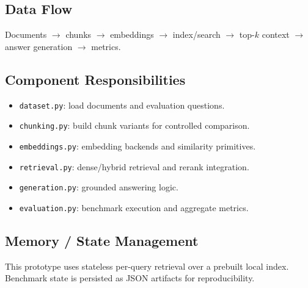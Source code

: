 \documentclass[11pt,a4paper]{article}
\begin{document}
\subsection{Data Flow}
Documents $\rightarrow$ chunks $\rightarrow$ embeddings $\rightarrow$ index/search $\rightarrow$ top-$k$ context $\rightarrow$ answer generation $\rightarrow$ metrics.

\subsection{Component Responsibilities}
\begin{itemize}
  \item \texttt{dataset.py}: load documents and evaluation questions.
  \item \texttt{chunking.py}: build chunk variants for controlled comparison.
  \item \texttt{embeddings.py}: embedding backends and similarity primitives.
  \item \texttt{retrieval.py}: dense/hybrid retrieval and rerank integration.
  \item \texttt{generation.py}: grounded answering logic.
  \item \texttt{evaluation.py}: benchmark execution and aggregate metrics.
\end{itemize}

\subsection{Memory / State Management}
This prototype uses stateless per-query retrieval over a prebuilt local index. Benchmark state is persisted as JSON artifacts for reproducibility.
\end{document}
